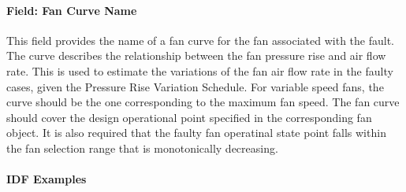 \paragraph{Field: Fan Curve Name}\label{field-fan-curve-name}

This field provides the name of a fan curve for the fan associated with the fault. The curve describes the relationship between the fan pressure rise and air flow rate. This is used to estimate the variations of the fan air flow rate in the faulty cases, given the Pressure Rise Variation Schedule. For variable speed fans, the curve should be the one corresponding to the maximum fan speed. The fan curve should cover the design operational point specified in the corresponding fan object. It is also required that the faulty fan operatinal state point falls within the fan selection range that is monotonically decreasing.

\paragraph{IDF Examples}\label{an-example-of-idf-codes-for-the-fouling-air-filter-fault-models}

